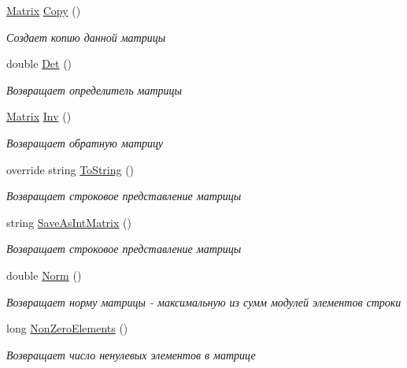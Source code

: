 \begin{DoxyCompactItemize}
\hyperlink{class_b_l_a_s_1_1_matrix}{Matrix} \hyperlink{class_b_l_a_s_1_1_matrix_acbb991a74ebf35c9932aaedc8b936f51}{Copy} ()
\begin{DoxyCompactList}\small\item\em Создает копию данной матрицы \end{DoxyCompactList}\item 
double \hyperlink{class_b_l_a_s_1_1_matrix_a2ea117d5fbaeddc4928b9f6b390dfe4c}{Det} ()
\begin{DoxyCompactList}\small\item\em Возвращает определитель матрицы \end{DoxyCompactList}\item 
\hyperlink{class_b_l_a_s_1_1_matrix}{Matrix} \hyperlink{class_b_l_a_s_1_1_matrix_aa6af90c35062376d6e0db316fd2cad70}{Inv} ()
\begin{DoxyCompactList}\small\item\em Возвращает обратную матрицу \end{DoxyCompactList}\item 
override string \hyperlink{class_b_l_a_s_1_1_matrix_a5d8dcb0da420eb386ca861d669cec9c5}{To\+String} ()
\begin{DoxyCompactList}\small\item\em Возвращает строковое представление матрицы \end{DoxyCompactList}\item 
string \hyperlink{class_b_l_a_s_1_1_matrix_a838540b46c1b19cdf618842d94283d31}{Save\+As\+Int\+Matrix} ()
\begin{DoxyCompactList}\small\item\em Возвращает строковое представление матрицы \end{DoxyCompactList}\item 
double \hyperlink{class_b_l_a_s_1_1_matrix_af16842e488d9bf861c76c47c5fe0f4bf}{Norm} ()
\begin{DoxyCompactList}\small\item\em Возвращает норму матрицы -\/ максимальную из сумм модулей элементов строки \end{DoxyCompactList}\item 
long \hyperlink{class_b_l_a_s_1_1_matrix_af471c79d0dfb885d8e2d65de20359b75}{Non\+Zero\+Elements} ()
\begin{DoxyCompactList}\small\item\em Возвращает число ненулевых элементов в матрице \end{DoxyCompactList}\end{DoxyCompactItemize}
